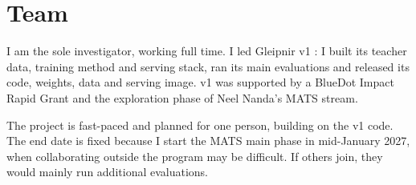 \section{Team}
\label{sec:team}
I am the sole investigator, working full time. I led Gleipnir v1
\citep{ferrao2026gleipnir}: I built its teacher data, training method and
serving stack, ran its main evaluations and released its code, weights, data
and serving image. v1 was supported by a BlueDot Impact Rapid Grant and the
exploration phase of Neel Nanda's MATS stream.

The project is fast-paced and planned for one person, building on the v1
code. The end date is fixed because I start the MATS main phase in
mid-January 2027, when collaborating outside the program may be difficult. If
others join, they would mainly run additional evaluations.
